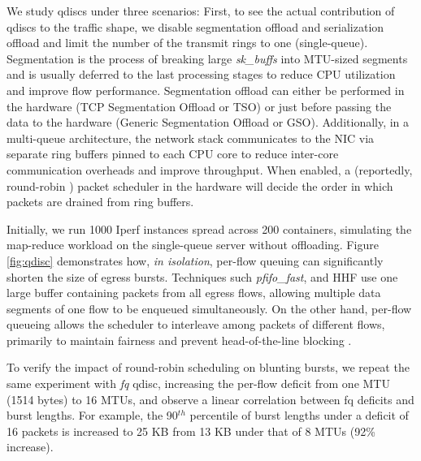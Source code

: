 We study qdiscs under three scenarios: First, to see the actual contribution of qdiscs to the traffic shape, we disable segmentation offload and serialization offload and limit the number of the transmit rings to one (single-queue). Segmentation is the process of breaking large \textit{sk\_buffs} into MTU-sized segments and is usually deferred to the last processing stages to reduce CPU utilization and improve flow performance. Segmentation offload can either be performed in the hardware (TCP Segmentation Offload or TSO) or just before passing the data to the hardware (Generic Segmentation Offload or GSO). Additionally, in a multi-queue architecture, the network stack communicates to the NIC via separate ring buffers pinned to each CPU core to reduce inter-core communication overheads and improve throughput. When enabled, a (reportedly, round-robin \cite{titan}) packet scheduler in the hardware will decide the order in which packets are drained from ring buffers.

Initially, we run 1000 Iperf instances spread across 200 containers, simulating the map-reduce workload on the single-queue server without offloading. Figure \ref{fig:qdisc} demonstrates how, \emph{in isolation}, per-flow queuing can significantly shorten the size of egress bursts. Techniques such \textit{pfifo\_fast}, and HHF use one large buffer containing packets from all egress flows, allowing multiple data segments of one flow to be enqueued simultaneously. On the other hand, per-flow queueing allows the scheduler to interleave among packets of different flows, primarily to maintain fairness and prevent head-of-the-line blocking \cite{backdraft}.

To verify the impact of round-robin scheduling on blunting bursts, we repeat the same experiment with \textit{fq} qdisc, increasing the per-flow deficit from one MTU (1514 bytes) to 16 MTUs, and observe a linear correlation between fq deficits and burst lengths. For example, the 90$^{th}$ percentile of burst lengths under a deficit of 16 packets is increased to 25 KB from 13 KB under that of 8 MTUs (92\% increase). 

